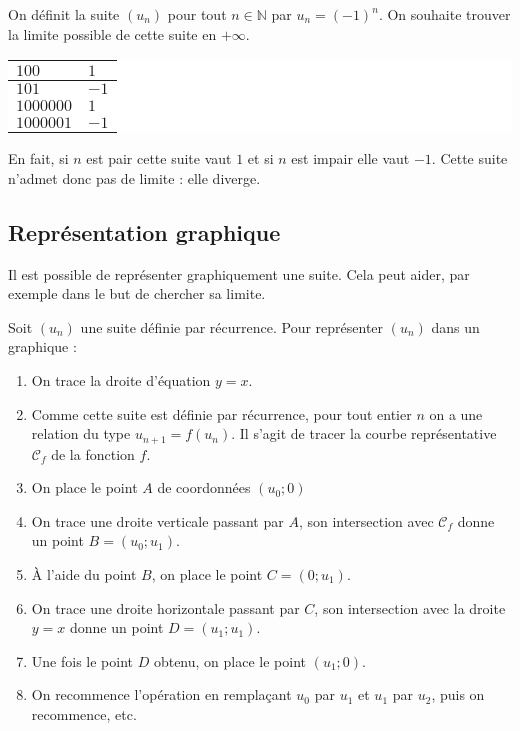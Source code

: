 	\begin{tip}[Exemple]
		On définit la suite $(u_n)$ pour tout $n \in \mathbb{N}$ par $u_n = (-1)^n$. On souhaite trouver la limite possible de cette suite en $+ \infty$.
		\newpar
		\begingroup\setlength{\fboxsep}{0pt}
		\colorbox{white}{%
			\begin{tabularx}{\textwidth}{|X|X|}
				\hline
				$100$ & $1$ \\
				\hline
				$101$ & $-1$ \\
				\hline
				$1 000 000$ & $1$ \\
				\hline
				$1 000 001$ & $-1$ \\
				\hline
			\end{tabularx}%
		}
		\endgroup
		\newpar
		En fait, si $n$ est pair cette suite vaut $1$ et si $n$ est impair elle vaut $-1$. Cette suite n'admet donc pas de limite : elle diverge.
	\end{tip}

	\subsection{Représentation graphique}

	Il est possible de représenter graphiquement une suite. Cela peut aider, par exemple dans le but de chercher sa limite.

	\begin{formula}
		Soit $(u_n)$ une suite définie par récurrence. Pour représenter $(u_n)$ dans un graphique :
		\begin{enumerate}
			\item On trace la droite d'équation $y = x$.
			\item  Comme cette suite est définie par récurrence, pour tout entier $n$ on a une relation du type $u_{n+1} = f(u_n)$. Il s'agit de tracer la courbe représentative $\mathcal{C}_f$ de la fonction $f$.
			\item On place le point $A$ de coordonnées $(u_0; 0)$
			\item On trace une droite verticale passant par $A$, son intersection avec $\mathcal{C}_f$ donne un point $B = (u_0; u_1)$.
			\item À l'aide du point $B$, on place le point $C = (0; u_1)$.
			\item On trace une droite horizontale passant par $C$, son intersection avec la droite $y = x$ donne un point $D = (u_1; u_1)$.
			\item Une fois le point $D$ obtenu, on place le point $(u_1; 0)$.
			\item On recommence l'opération en remplaçant $u_0$ par $u_1$ et $u_1$ par $u_2$, puis on recommence, etc.
		\end{enumerate}
	\end{formula}

